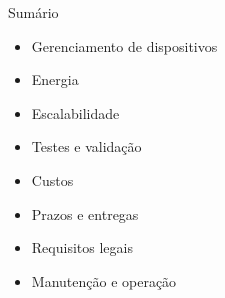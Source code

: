 
\begin{frame}{Sumário}
    \begin{itemize}
        \item Gerenciamento de dispositivos 
        \item Energia
        \item Escalabilidade
        \item Testes e validação
        \item Custos
        \item Prazos e entregas
        \item Requisitos legais 
        \item Manutenção e operação
    \end{itemize}
\end{frame}